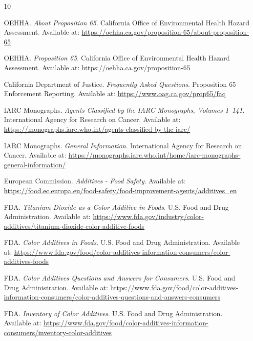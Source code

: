 \documentclass[11pt]{article}
\begin{document}
\begin{thebibliography}{10}

OEHHA.
\newblock \emph{About Proposition 65}.
\newblock California Office of Environmental Health Hazard Assessment.
\newblock Available at: \url{https://oehha.ca.gov/proposition-65/about-proposition-65}

OEHHA.
\newblock \emph{Proposition 65}.
\newblock California Office of Environmental Health Hazard Assessment.
\newblock Available at: \url{https://oehha.ca.gov/proposition-65}

California Department of Justice.
\newblock \emph{Frequently Asked Questions}.
\newblock Proposition 65 Enforcement Reporting.
\newblock Available at: \url{https://www.oag.ca.gov/prop65/faq}

IARC Monographs.
\newblock \emph{Agents Classified by the IARC Monographs, Volumes 1--141}.
\newblock International Agency for Research on Cancer.
\newblock Available at: \url{https://monographs.iarc.who.int/agents-classified-by-the-iarc/}

IARC Monographs.
\newblock \emph{General Information}.
\newblock International Agency for Research on Cancer.
\newblock Available at: \url{https://monographs.iarc.who.int/home/iarc-monographs-general-information/}

European Commission.
\newblock \emph{Additives - Food Safety}.
\newblock Available at: \url{https://food.ec.europa.eu/food-safety/food-improvement-agents/additives_en}

FDA.
\newblock \emph{Titanium Dioxide as a Color Additive in Foods}.
\newblock U.S. Food and Drug Administration.
\newblock Available at: \url{https://www.fda.gov/industry/color-additives/titanium-dioxide-color-additive-foods}

FDA.
\newblock \emph{Color Additives in Foods}.
\newblock U.S. Food and Drug Administration.
\newblock Available at: \url{https://www.fda.gov/food/color-additives-information-consumers/color-additives-foods}

FDA.
\newblock \emph{Color Additives Questions and Answers for Consumers}.
\newblock U.S. Food and Drug Administration.
\newblock Available at: \url{https://www.fda.gov/food/color-additives-information-consumers/color-additives-questions-and-answers-consumers}

FDA.
\newblock \emph{Inventory of Color Additives}.
\newblock U.S. Food and Drug Administration.
\newblock Available at: \url{https://www.fda.gov/food/color-additives-information-consumers/inventory-color-additives}

\end{thebibliography}
\end{document}
